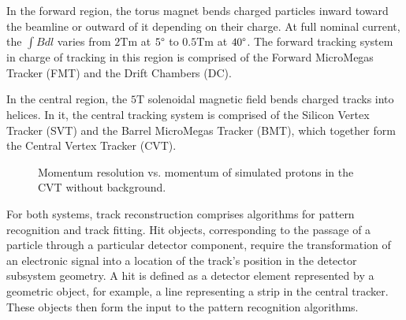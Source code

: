     In the forward region, the torus magnet bends charged particles inward toward the beamline or outward of it depending on their charge.
    At full nominal current, the $\int Bdl$ varies from $2 \text{Tm}$ at $5\degree$ to $0.5 \text{Tm}$ at $40\degree$.
    The forward tracking system in charge of tracking in this region is comprised of the Forward MicroMegas Tracker (FMT) and the Drift Chambers (DC).

    In the central region, the $5 \text{T}$ solenoidal magnetic field bends charged tracks into helices.
    In it, the central tracking system is comprised of the Silicon Vertex Tracker (SVT) and the Barrel MicroMegas Tracker (BMT), which together form the Central Vertex Tracker (CVT).

    \begin{figure}
        \centering{}
        \caption[CVT momentum resolution vs. momentum.]{Momentum resolution vs. momentum of simulated protons in the CVT without background.}
        \label{fig::cvt_pres}
    \end{figure}

    For both systems, track reconstruction comprises algorithms for pattern recognition and track fitting. Hit objects, corresponding to the passage of a particle through a particular detector component, require the transformation of an electronic signal into a location of the track’s
    position in the detector subsystem geometry.
    A hit is defined as a detector element represented by a geometric object, for example, a line representing a strip in the central tracker.
    These objects then form the input to the pattern recognition algorithms.

